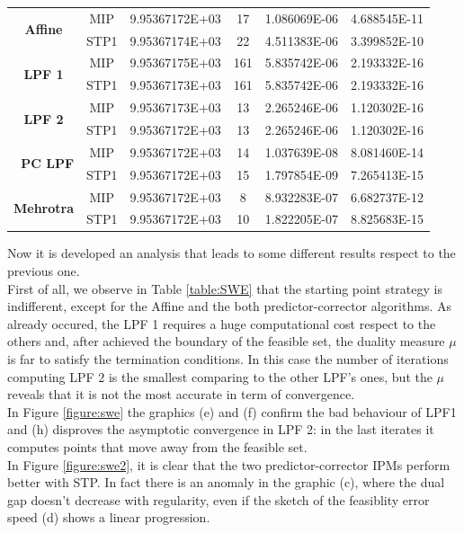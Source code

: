 \documentclass[a4paper,10 pt,titlepage,twoside]{book}
\theoremstyle{plain}
\theoremstyle{definition}
\theoremstyle{remark}
\begin{document}
{{\begin{table}[t]
\begin{tabular}{cclcll}
		\multicolumn{1}{c|}{\multirow{2}{*}{\textbf{Affine}}} & MIP & 9.95367172E+03 & 17 & 1.086069E-06 & 4.688545E-11 \\
		\multicolumn{1}{c|}{} & STP1 & 9.95367174E+03 & 22 & 4.511383E-06 & 3.399852E-10 \\ \hline
		\multicolumn{1}{c|}{\multirow{2}{*}{\textbf{LPF 1}}} & MIP & 9.95367175E+03 & 161 & 5.835742E-06 & 2.193332E-16 \\
		\multicolumn{1}{c|}{} & STP1 & 9.95367173E+03 & 161 & 5.835742E-06 & 2.193332E-16 \\ \hline
		\multicolumn{1}{c|}{\multirow{2}{*}{\textbf{LPF 2}}} & MIP & 9.95367173E+03 & 13 & 2.265246E-06 & 1.120302E-16 \\
		\multicolumn{1}{c|}{} & STP1 & 9.95367172E+03 & 13 & 2.265246E-06 & 1.120302E-16 \\ \hline
		\multicolumn{1}{r|}{\multirow{2}{*}{\textbf{PC LPF}}} & MIP & 9.95367172E+03 & 14 & 1.037639E-08 & 8.081460E-14 \\
		\multicolumn{1}{r|}{} & STP1 & 9.95367172E+03 & 15 & 1.797854E-09 & 7.265413E-15 \\ \hline
		\multicolumn{1}{c|}{\multirow{2}{*}{\textbf{Mehrotra}}} & MIP & 9.95367172E+03 & 8 & 8.932283E-07 & 6.682737E-12 \\
		\multicolumn{1}{c|}{} & STP1 & 9.95367172E+03 & 10 & 1.822205E-07 & 8.825683E-15 \\ \hline
	\end{tabular}
\end{table}
Now it is developed an analysis that leads to 
some different results respect to the previous one. \\First of all, we observe in Table \ref{table:SWE} that the starting point strategy is indifferent, except for the Affine and the both predictor-corrector algorithms. As already occured, the LPF 1 requires a huge computational cost respect to the others and, after achieved the boundary of the feasible set, the duality measure $\mu$ is far to satisfy the termination conditions. In this case the number of iterations computing LPF 2 is the smallest comparing to the other LPF's ones, but the $\mu$ reveals that it is not the most accurate in term of convergence.\\
In Figure \ref{figure:swe} the graphics (e) and (f) confirm the bad behaviour of LPF1 and (h) disproves the asymptotic convergence in LPF 2: in the last iterates it computes points that move away from the feasible set.\\
In Figure \ref{figure:swe2}, it is clear that the two predictor-corrector IPMs perform better with STP. In fact there is an anomaly in the graphic (c), where the dual gap doesn't decrease with regularity, even if the sketch of the feasiblity error speed (d) shows a linear progression. \\
}}
\end{document}
